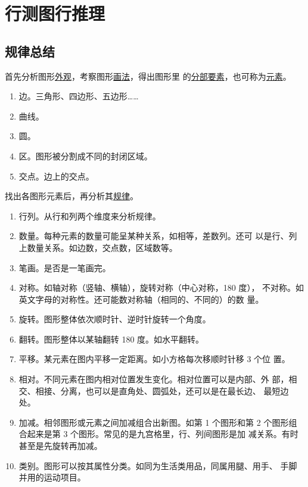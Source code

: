 \chapter{行测图行推理}


\section{规律总结}

首先分析图形\uline{外观}，考察图形\uline{画法}，得出图形里
的\uline{分部要素}，也可称为\uline{元素}。

\begin{enumerate}
\item 边。三角形、四边形、五边形……
\item 曲线。
\item 圆。
\item 区。图形被分割成不同的封闭区域。
\item 交点。边上的交点。
\end{enumerate}

找出各图形元素后，再分析其\uline{规律}。

\begin{enumerate}
\item 行列。从行和列两个维度来分析规律。
\item 数量。每种元素的数量可能呈某种关系，如相等，差数列。还可
  以是行、列上数量关系。如边数，交点数，区域数等。
\item 笔画。是否是一笔画完。
\item 对称。如轴对称（竖轴、横轴），旋转对称（中心对称，180 度），
  不对称。如英文字母的对称性。还可能数对称轴（相同的、不同的）的数
  量。
\item 旋转。图形整体依次顺时针、逆时针旋转一个角度。
\item 翻转。图形整体以某轴翻转 180 度。如水平翻转。
\item 平移。某元素在图内平移一定距离。如小方格每次移顺时针移 3 个位
  置。
\item 相对。不同元素在图内相对位置发生变化。相对位置可以是内部、外
  部，相交、相接、分离，也可以是直角处、圆弧处，还可以是在最长边、
  最短边处。
\item 加减。相邻图形或元素之间加减组合出新图。如第 1 个图形和第 2
  个图形组合起来是第 3 个图形。常见的是九宫格里，行、列间图形是加
  减关系。有时甚至是先旋转再加减。
\item 类别。图形可以按其属性分类。如同为生活类用品，同属用腿、用手、
  手脚并用的运动项目。
\end{enumerate}

